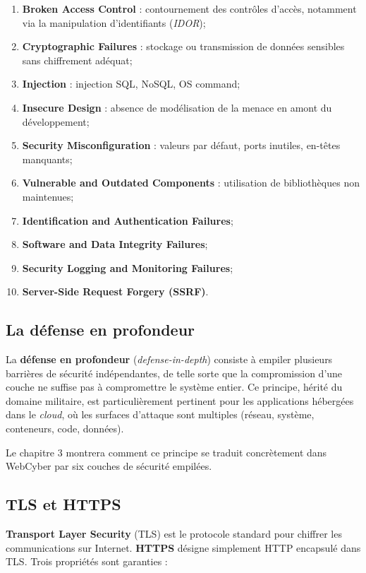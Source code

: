 \begin{enumerate}
  \item \textbf{Broken Access Control} : contournement des contrôles
        d'accès, notamment via la manipulation d'identifiants
        (\textit{IDOR});
  \item \textbf{Cryptographic Failures} : stockage ou transmission de
        données sensibles sans chiffrement adéquat;
  \item \textbf{Injection} : injection SQL, NoSQL, OS command;
  \item \textbf{Insecure Design} : absence de modélisation de la menace
        en amont du développement;
  \item \textbf{Security Misconfiguration} : valeurs par défaut, ports
        inutiles, en-têtes manquants;
  \item \textbf{Vulnerable and Outdated Components} : utilisation de
        bibliothèques non maintenues;
  \item \textbf{Identification and Authentication Failures};
  \item \textbf{Software and Data Integrity Failures};
  \item \textbf{Security Logging and Monitoring Failures};
  \item \textbf{Server-Side Request Forgery (SSRF)}.
\end{enumerate}

\subsection{La défense en profondeur}

La \textbf{défense en profondeur} (\textit{defense-in-depth}) consiste à
empiler plusieurs barrières de sécurité indépendantes, de telle sorte
que la compromission d'une couche ne suffise pas à compromettre le
système entier. Ce principe, hérité du domaine militaire, est
particulièrement pertinent pour les applications hébergées dans le
\emph{cloud}, où les surfaces d'attaque sont multiples (réseau,
système, conteneurs, code, données).

Le chapitre 3 montrera comment ce principe se traduit concrètement dans
WebCyber par six couches de sécurité empilées.

\subsection{TLS et HTTPS}

\textbf{Transport Layer Security} (TLS) est le protocole standard pour
chiffrer les communications sur Internet. \textbf{HTTPS} désigne
simplement HTTP encapsulé dans TLS. Trois propriétés sont garanties :

